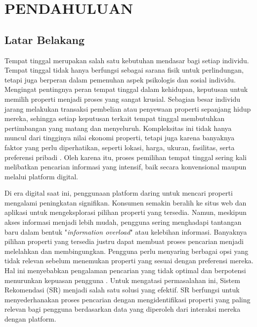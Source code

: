 \chapter{PENDAHULUAN}
\label{chap:pendahuluan}


\section{Latar Belakang}
\label{sec:latarbelakang}

Tempat tinggal merupakan salah satu kebutuhan mendasar bagi setiap individu. 
Tempat tinggal tidak hanya berfungsi sebagai sarana fisik untuk perlindungan, tetapi juga berperan dalam pemenuhan aspek psikologis dan sosial individu. 
Mengingat pentingnya peran tempat tinggal dalam kehidupan, keputusan untuk memilih properti menjadi proses yang sangat krusial. 
Sebagian besar individu jarang melakukan transaksi pembelian atau penyewaan properti sepanjang hidup mereka, sehingga setiap keputusan terkait tempat tinggal membutuhkan pertimbangan yang matang dan menyeluruh. 
Kompleksitas ini tidak hanya muncul dari tingginya nilai ekonomi properti, tetapi juga karena banyaknya faktor yang perlu diperhatikan, seperti lokasi, harga, ukuran, fasilitas, serta preferensi pribadi \parencite{Gharahighehi2021}. 
Oleh karena itu, proses pemilihan tempat tinggal sering kali melibatkan pencarian informasi yang intensif, baik secara konvensional maupun melalui platform digital.

Di era digital saat ini, penggunaan platform daring untuk mencari properti mengalami peningkatan signifikan. 
Konsumen semakin beralih ke situs web dan aplikasi untuk mengeksplorasi pilihan properti yang tersedia. 
Namun, meskipun akses informasi menjadi lebih mudah, pengguna sering menghadapi tantangan baru dalam bentuk "\emph{information overload}" atau kelebihan informasi. 
Banyaknya pilihan properti yang tersedia justru dapat membuat proses pencarian menjadi melelahkan dan membingungkan. 
Pengguna perlu menyaring berbagai opsi yang tidak relevan sebelum menemukan properti yang sesuai dengan preferensi mereka. 
Hal ini menyebabkan pengalaman pencarian yang tidak optimal dan berpotensi menurunkan kepuasan pengguna \parencite{YuYonghongandWang2018}. 
Untuk mengatasi permasalahan ini, Sistem Rekomendasi (SR) menjadi salah satu solusi yang efektif. 
SR berfungsi untuk menyederhanakan proses pencarian dengan mengidentifikasi properti yang paling relevan bagi pengguna berdasarkan data yang diperoleh dari interaksi mereka dengan platform.

